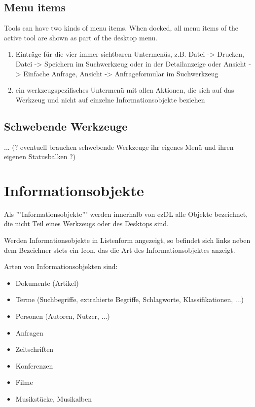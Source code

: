 \documentclass[12pt]{book}
\begin{document}
\subsection{Menu items}


Tools can have two kinds of menu items. When docked, all menu items of the active tool are shown as part of the desktop menu. %

\begin{enumerate}
\item Einträge für die vier immer sichtbaren Untermenüs, z.B. Datei -> Drucken, Datei -> Speichern im Suchwerkzeug oder in der Detailanzeige oder Ansicht -> Einfache Anfrage, Ansicht -> Anfrageformular im Suchwerkzeug
\item ein werkzeugspezifisches Untermenü mit allen Aktionen, die sich auf das Werkzeug und nicht auf einzelne Informationsobjekte beziehen
\end{enumerate}



\subsection{Schwebende Werkzeuge}

... (? eventuell brauchen schwebende Werkzeuge ihr eigenes Menü und ihren eigenen Statusbalken ?)

\section{Informationsobjekte}

Als '''Informationsobjekte''' werden innerhalb von ezDL alle Objekte bezeichnet, die nicht Teil eines Werkzeugs oder des Desktops sind. 

Werden Informationsobjekte in Listenform angezeigt, so befindet sich links neben dem Bezeichner stets ein Icon, das die Art des Informationsobjektes anzeigt. 

Arten von Informationsobjekten sind:
\begin{itemize}
\item Dokumente (Artikel)
\item Terme (Suchbegriffe, extrahierte Begriffe, Schlagworte, Klassifikationen, ...)
\item Personen (Autoren, Nutzer, ...)
\item Anfragen 
\item Zeitschriften
\item Konferenzen
\item Filme
\item Musikstücke, Musikalben
\end{itemize}
\end{document}
